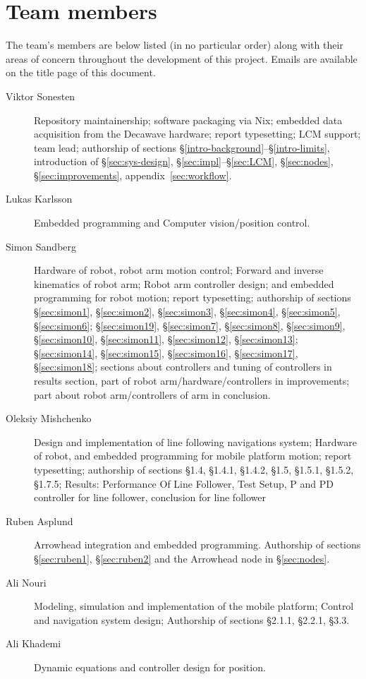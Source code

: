 \section{Team members}
The team's members are below listed (in no particular order) along with their areas of concern throughout the development of this project.
Emails are available on the title page of this document.

\begin{description}
\item[Viktor Sonesten] Repository maintainership; software packaging via
  Nix; embedded data acquisition from the Decawave hardware; report
  typesetting; LCM support; team lead; authorship of sections
  §\ref{intro-background}--§\ref{intro-limits}, introduction of
  §\ref{sec:sys-design}, §\ref{sec:impl}--§\ref{sec:LCM},
  §\ref{sec:nodes}, §\ref{sec:improvements},
  appendix~\ref{sec:workflow}.

    \item[Lukas Karlsson]
    Embedded programming and
    Computer vision/position control.

    \item[Simon Sandberg]
    Hardware of robot, robot arm motion control;
    Forward and inverse kinematics of robot arm;
    Robot arm controller design;
    and embedded programming for robot motion; report
    typesetting; authorship of sections §\ref{sec:simon1}, §\ref{sec:simon2}, §\ref{sec:simon3}, §\ref{sec:simon4}, §\ref{sec:simon5}, §\ref{sec:simon6};
    §\ref{sec:simon19}, §\ref{sec:simon7}, §\ref{sec:simon8}, §\ref{sec:simon9}, §\ref{sec:simon10}, §\ref{sec:simon11}, §\ref{sec:simon12}, §\ref{sec:simon13};
    §\ref{sec:simon14}, §\ref{sec:simon15}, §\ref{sec:simon16}, §\ref{sec:simon17}, §\ref{sec:simon18};
    sections about controllers and tuning of controllers in results section, part of robot arm/hardware/controllers in improvements;
    part about robot arm/controllers of arm in conclusion.

    \item[Oleksiy Mishchenko]
    Design and implementation of line following navigations system;
    Hardware of robot, and embedded programming for mobile platform motion; report
     typesetting; authorship of sections §1.4, §1.4.1, §1.4.2, §1.5, §1.5.1, §1.5.2, §1.7.5;
     Results: Performance Of Line Follower, Test Setup, P and PD controller for line follower, conclusion for line follower

    \item[Ruben Asplund]
    Arrowhead integration and embedded programming.
    Authorship of sections §\ref{sec:ruben1}, §\ref{sec:ruben2} and the Arrowhead node in §\ref{sec:nodes}.

    \item[Ali Nouri]
    Modeling, simulation and implementation of the mobile platform;
    Control and navigation system design;
    Authorship of sections §2.1.1, §2.2.1, §3.3.

    \item[Ali Khademi]
    Dynamic equations and controller design for position.
\end{description}
